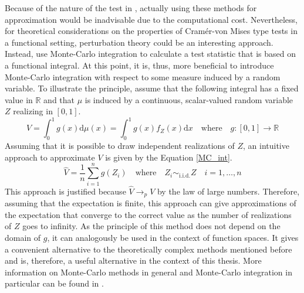 \documentclass[12pt, a4paper]{article}
\theoremstyle{MAstyle} \newtheorem{assumption}{Assumption}[section]
\theoremstyle{MAstyle} \newtheorem{definition}{Definition}[section]
\theoremstyle{MAstyle} \newtheorem{theorem}{Theorem}[section]
\begin{document}
			Because of the nature of the test in \cite{bugni_permutation_2021}, actually using these methods for approximation would be inadvisable due to the computational cost. Nevertheless, for theoretical considerations on the properties of Cram\'{e}r-von Mises type tests in a functional setting, perturbation theory could be an interesting approach. 
			Instead, \cite{bugni_permutation_2021} use Monte-Carlo integration to calculate a test statistic that is based on a functional integral. At this point, it is, thus, more beneficial to introduce Monte-Carlo integration with respect to some measure induced by a random variable. 
			To illustrate the principle, assume that the following integral has a fixed value in $\mathbb{R}$ and that $\mu$ is induced by a continuous, scalar-valued random variable $Z$ realizing in $[0,1]$.
			\begin{equation}
				V = \int_{0}^{1} g(x) \mathrm{d}\mu(x) = \int_{0}^{1} g(x) f_Z(x) \mathrm{d}x \quad \text{where} \quad g:[0,1] \rightarrow \mathbb{R}
			\end{equation}
			Assuming that it is possible to draw independent realizations of $Z$, an intuitive approach to approximate $V$ is given by the Equation \ref{MC_int}.
			\begin{equation}\label{MC_int}
				\hat{V} = \frac{1}{n} \sum_{i = 1}^{n} g(Z_i) \quad \text{where} \quad Z_i \sim_{\text{i.i.d.}} Z \quad i = 1, \dots, n
			\end{equation}
			This approach is justified because $\hat{V} \rightarrow_p V$ by the law of large numbers.
			Therefore, assuming that the expectation is finite, this approach can give approximations of the expectation that converge to the correct value as the number of realizations of $Z$ goes to infinity.
			As the principle of this method does not depend on the domain of $g$, it can analogously be used in the context of function spaces. It gives a convenient alternative to the theoretically complex methods mentioned before and is, therefore, a useful alternative in the context of this thesis. More information on Monte-Carlo methods in general and Monte-Carlo integration in particular can be found in \cite{shonkwiler_explorations_2009}.
		
\end{document}
